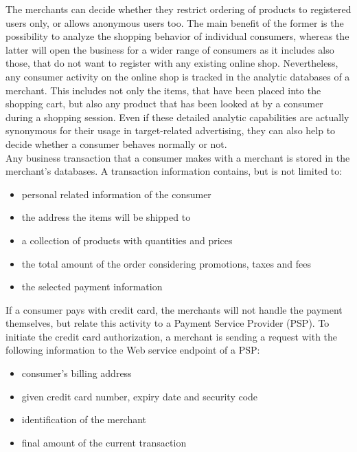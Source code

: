 The merchants can decide whether they restrict ordering of products to registered users only, or allows anonymous users too. The main benefit of the former is the possibility to analyze the shopping behavior of individual consumers, whereas the latter will open the business for a wider range of consumers as it includes also those, that do not want to register with any existing online shop. Nevertheless, any consumer activity on the online shop is tracked in the analytic databases of a merchant. This includes not only the items, that have been placed into the shopping cart, but also any product that has been looked at by a consumer during a shopping session. Even if these detailed analytic capabilities are actually synonymous for their usage in target-related advertising, they can also help to decide whether a consumer behaves normally or not. \\

Any business transaction that a consumer makes with a merchant is stored in the merchant's databases. A transaction information contains, but is not limited to:\@

\begin{itemize}
		\item personal related information of the consumer
		\item the address the items will be shipped to
		\item a collection of products with quantities and prices
		\item the total amount of the order considering promotions, taxes and fees
		\item the selected payment information
\end{itemize}

If a consumer pays with credit card, the merchants will not handle the payment themselves, but relate this activity to a Payment Service Provider (\gls{PSP}). To initiate the credit card authorization, a merchant is sending a request with the following information to the Web service endpoint of a \gls{PSP}: \@

\begin{itemize}
    \item consumer's billing address
    \item given credit card number, expiry date and security code
    \item identification of the merchant
    \item final amount of the current transaction
\end{itemize}

